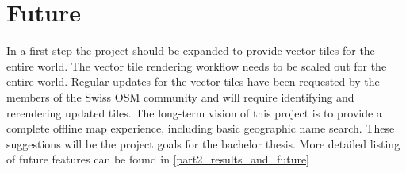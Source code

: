 \section{Future}\label{part1_future}
In a first step the project should be expanded to provide vector tiles for the entire world.
The vector tile rendering workflow needs to be scaled out for the entire world.
\newline{}
Regular updates for the vector tiles have been requested by the members of the Swiss OSM community
and will require identifying and rerendering updated tiles.
\newline{}
The long-term vision of this project is to provide a complete offline map experience, including basic geographic name search.
\newline{}
These suggestions will be the project goals for the bachelor thesis. More detailed listing of
future features can be found in \autoref{part2_results_and_future}
